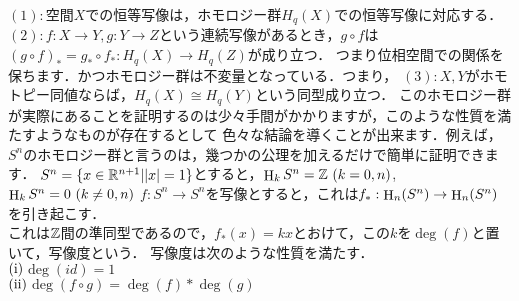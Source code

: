 $(1):$空間$X$での恒等写像は，ホモロジー群$H_q(X)$での恒等写像に対応する．\\
$(2):$$f:X\to Y,g:Y\to Z$という連続写像があるとき，$g\circ f$は$(g\circ f)_* = g_* \circ f_* :H_q(X) \to H_q(Z)$が成り立つ．
つまり位相空間での関係を保ちます．かつホモロジー群は不変量となっている．つまり，
$(3):$$X,Y$がホモトピー同値ならば，$H_q(X) \cong H_q(Y)$という同型成り立つ．
このホモロジー群が実際にあることを証明するのは少々手間がかかりますが，このような性質を満たすようなものが存在するとして
色々な結論を導くことが出来ます．例えば，$S^n$のホモロジー群と言うのは，幾つかの公理を加えるだけで簡単に証明できます．
\thm
$S^n=\{x\in\mathbb R^{n+1} | |x|=1\}$とすると，$\mathop{\mathrm{H}}\nolimits_k S^n = \mathbb Z\  (k=0,n)$,$\mathop{\mathrm{H}}\nolimits_k S^n = 0\  (k\neq 0,n)$
\thmx
\thm
$f:S^n \to S^n$を写像とすると，これは$f_*:\mathop{\mathrm{H}}\nolimits_n(S^n)\to \mathop{\mathrm{H}}\nolimits_n(S^n)$を引き起こす．\\
これは$\mathbb Z$間の準同型であるので，$f_*(x) = kx$とおけて，この$k$を$\deg(f)$と置いて，写像度という．
\thmx
\prop
写像度は次のような性質を満たす．\\
$\rm (i)$$\deg(id)=1$\\
$\rm (ii)$$\deg(f\circ g) = \deg(f)*\deg(g)$\\
